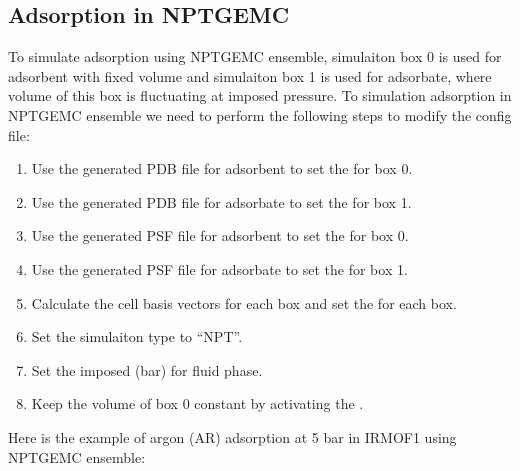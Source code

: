 \documentclass[letterpaper,10pt,english]{sphinxmanual}
\begin{document}
\subsection{Adsorption in NPT\sphinxhyphen{}GEMC}
\label{\detokenize{howto:adsorption-in-npt-gemc}}
To simulate adsorption using NPT\sphinxhyphen{}GEMC ensemble, simulaiton box 0 is used for adsorbent with fixed volume and simulaiton box 1 is used for adsorbate, where
volume of this box is fluctuating at imposed pressure. To simulation adsorption in NPT\sphinxhyphen{}GEMC ensemble we need to perform the following steps to modify the
config file:
\begin{enumerate}
%
\item {} 
Use the generated PDB file for adsorbent to set the  for box 0.

\item {} 
Use the generated PDB file for adsorbate to set the  for box 1.

\item {} 
Use the generated PSF file for adsorbent to set the  for box 0.

\item {} 
Use the generated PSF file for adsorbate to set the  for box 1.

\item {} 
Calculate the cell basis vectors for each box and set the  for each box.

\item {} 
Set the  simulaiton type to “NPT”.

\item {} 
Set the imposed  (bar) for fluid phase.

\item {} 
Keep the volume of box 0 constant by activating the .

\end{enumerate}

Here is the example of argon (AR) adsorption at 5 bar in IRMOF\sphinxhyphen{}1 using NPT\sphinxhyphen{}GEMC ensemble:
\end{document}

